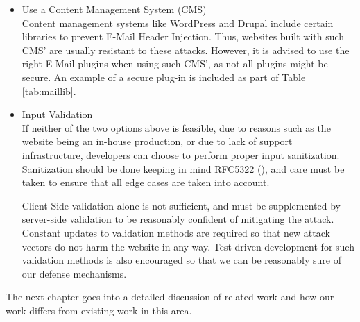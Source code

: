 \begin{itemize}
	\item Use a Content Management System (CMS) \\
	Content management systems like WordPress and Drupal include certain libraries to prevent E-Mail Header Injection. Thus, websites built with such CMS' are usually resistant to these attacks. However, it is advised to use the right E-Mail plugins when using such CMS', as not all plugins might be secure.
	An example of a secure plug-in is included as part of Table \ref{tab:maillib}.
	
	\item Input Validation\\
	If neither of the two options above is feasible, due to reasons such as the website being an in-house production, or due to lack of support infrastructure, developers can choose to perform proper input sanitization. Sanitization should be done keeping in mind RFC5322 (\cite{rfc5322}), and care must be taken to ensure that all edge cases are taken into account.
	
	Client Side validation alone is not sufficient, and must be supplemented by server-side validation to be reasonably confident of mitigating the attack. Constant updates to validation methods are required so that new attack vectors do not harm the website in any way.
	Test driven development for such validation methods is also encouraged so that we can be reasonably sure of our defense mechanisms.
\end{itemize}

The next chapter goes into a detailed discussion of related work and how our work differs from existing work in this area.


